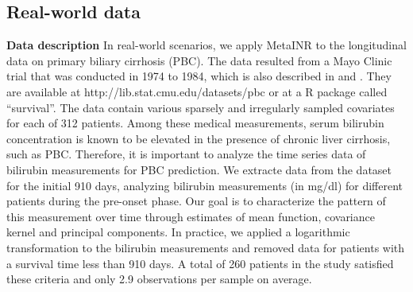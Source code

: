 \documentclass{article}
\begin{document}


\subsection{Real-world data}
\textbf{Data description} 
In real-world scenarios, we apply MetaINR to the longitudinal data on primary biliary cirrhosis (PBC).
The data resulted from a Mayo Clinic trial that was conducted in 1974 to 1984, 
which is also described in \cite{fleming2013counting} and \cite{murtaugh1994primary}. 
They are available at http://lib.stat.cmu.edu/datasets/pbc or at a R package called ``survival''.
The data contain various sparsely and irregularly sampled covariates for each of 312 patients. 
Among these medical measurements,
serum bilirubin concentration is known to be elevated in the presence of chronic liver cirrhosis, such as PBC.
Therefore, it is important to analyze the time series data of bilirubin measurements for PBC prediction.
We extracte data from the dataset for the initial 910 days, 
analyzing bilirubin measurements (in mg/dl) for different patients 
during the pre-onset phase. 
Our goal is to characterize the pattern of this measurement over time through estimates of mean function, covariance kernel and principal components.
In practice, we applied a logarithmic transformation to the bilirubin measurements and removed data for patients with a survival time less than 910 days.
A total of 260 patients in the study satisfied these criteria and only 2.9 observations per sample on average. 
\end{document}
